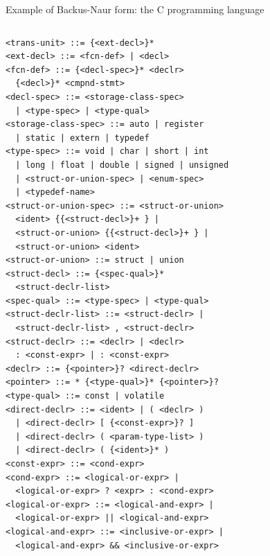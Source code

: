 \documentclass[aspectratio=169]{beamer}
\begin{document}
\begin{frame}[fragile]{Example of Backus-Naur form: the C programming language}
\fontsize{5}{0}\selectfont
\begin{columns}[t]
\begin{verbatim}
<trans-unit> ::= {<ext-decl>}*
<ext-decl> ::= <fcn-def> | <decl>
<fcn-def> ::= {<decl-spec>}* <declr>
  {<decl>}* <cmpnd-stmt>
<decl-spec> ::= <storage-class-spec>
  | <type-spec> | <type-qual>
<storage-class-spec> ::= auto | register
  | static | extern | typedef
<type-spec> ::= void | char | short | int
  | long | float | double | signed | unsigned
  | <struct-or-union-spec> | <enum-spec>
  | <typedef-name>
<struct-or-union-spec> ::= <struct-or-union>
  <ident> {{<struct-decl>}+ } |
  <struct-or-union> {{<struct-decl>}+ } |
  <struct-or-union> <ident>
<struct-or-union> ::= struct | union
<struct-decl> ::= {<spec-qual>}*
  <struct-declr-list>
<spec-qual> ::= <type-spec> | <type-qual>
<struct-declr-list> ::= <struct-declr> |
  <struct-declr-list> , <struct-declr>
<struct-declr> ::= <declr> | <declr>
  : <const-expr> | : <const-expr>
<declr> ::= {<pointer>}? <direct-declr>
<pointer> ::= * {<type-qual>}* {<pointer>}?
<type-qual> ::= const | volatile
<direct-declr> ::= <ident> | ( <declr> )
  | <direct-declr> [ {<const-expr>}? ]
  | <direct-declr> ( <param-type-list> )
  | <direct-declr> ( {<ident>}* )
<const-expr> ::= <cond-expr>
<cond-expr> ::= <logical-or-expr> |
  <logical-or-expr> ? <expr> : <cond-expr>
<logical-or-expr> ::= <logical-and-expr> |
  <logical-or-expr> || <logical-and-expr>
<logical-and-expr> ::= <inclusive-or-expr> |
  <logical-and-expr> && <inclusive-or-expr>
\end{verbatim}


\end{columns}
\end{frame}
\end{document}
